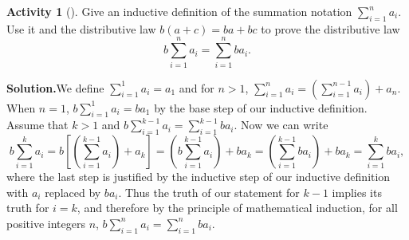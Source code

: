 \documentclass[10pt,]{book}
\theoremstyle{plain}
\theoremstyle{definition}
\newtheorem{activity}[project]{Activity}
\numberwithin{equation}{chapter}
\begin{document}
\begin{activity}[]\label{activity-76}
Give an inductive definition of the summation notation \(\sum_{i=1}^n a_i\). Use it and the distributive law \(b(a+c) = ba+bc\) to prove the distributive law%
\begin{equation*}
b\sum_{i=1}^n a_i = \sum_{i=1}^n ba_i.
\end{equation*}
%
\par\medskip\noindent%
\textbf{Solution.}\quad We define \(\sum_{i=1}^1a_i = a_1\) and for \(n>1\), \(\sum_{i=1}^n
a_i =  \left(\sum_{i=1}^{n-1}a_i\right) +a_n\). When \(n=1\), \(b\sum_{i=1}^1a_i =ba_1\) by the base step of our inductive definition. Assume that \(k>1\) and \(b\sum_{i=1}^{k-1}a_i=\sum_{i=1}^{k-1}ba_i\). Now we can write%
\begin{equation*}
b\sum_{i=1}^k a_i\!=\! b\left[\left(\sum_{i=1}^{k-1}a_i\right)+a_k\right]
\!=\!
\left(b\sum_{i=1}^{k-1}a_i\right) +ba_k \!=\! \left(\sum_{i=1}^{k-1}ba_i\right)
+ ba_k \!=\! \sum_{i=1}^k ba_i,
\end{equation*}
where the last step is justified by the inductive step of our inductive definition with \(a_i\) replaced by \(ba_i\). Thus the truth of our statement for \(k-1\) implies its truth for \(i=k\), and therefore by the principle of mathematical induction, for all positive integers \(n\), \(b\sum_{i=1}^na_i= \sum_{i=1}^nba_i\).%
\end{activity}
\typeout{************************************************}
\typeout{************************************************}
\end{document}
